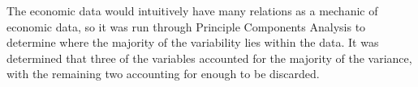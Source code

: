 \documentclass[prodmode]{acmsmall} %
\begin{document}
\begin{figure}[!t]
\end{figure}

The economic data would intuitively have many relations as a mechanic of
economic data, so it was run through Principle Components Analysis to determine
where the majority of the variability lies within the data. It was determined
that three of the variables accounted for the majority of the variance, with the
remaining two accounting for enough to be discarded.

\begin{figure}[!t]
\end{figure}
\end{document}
